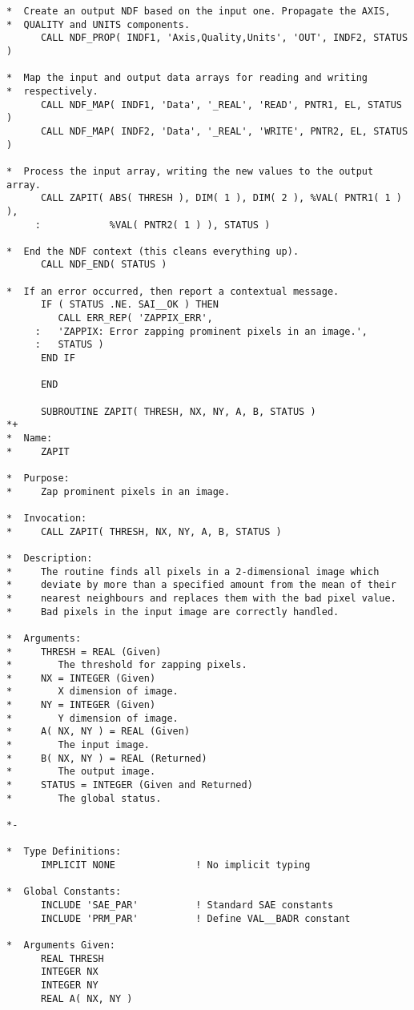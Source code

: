 \documentclass[twoside,11pt]{article}
\begin{document}
\begin{verbatim}
*  Create an output NDF based on the input one. Propagate the AXIS,
*  QUALITY and UNITS components.
      CALL NDF_PROP( INDF1, 'Axis,Quality,Units', 'OUT', INDF2, STATUS )

*  Map the input and output data arrays for reading and writing
*  respectively.
      CALL NDF_MAP( INDF1, 'Data', '_REAL', 'READ', PNTR1, EL, STATUS )
      CALL NDF_MAP( INDF2, 'Data', '_REAL', 'WRITE', PNTR2, EL, STATUS )
      
*  Process the input array, writing the new values to the output array.
      CALL ZAPIT( ABS( THRESH ), DIM( 1 ), DIM( 2 ), %VAL( PNTR1( 1 ) ),
     :            %VAL( PNTR2( 1 ) ), STATUS )

*  End the NDF context (this cleans everything up).
      CALL NDF_END( STATUS )

*  If an error occurred, then report a contextual message.
      IF ( STATUS .NE. SAI__OK ) THEN
         CALL ERR_REP( 'ZAPPIX_ERR',
     :   'ZAPPIX: Error zapping prominent pixels in an image.',
     :   STATUS )
      END IF

      END

      SUBROUTINE ZAPIT( THRESH, NX, NY, A, B, STATUS )
*+
*  Name:
*     ZAPIT

*  Purpose:
*     Zap prominent pixels in an image.

*  Invocation:
*     CALL ZAPIT( THRESH, NX, NY, A, B, STATUS )

*  Description:
*     The routine finds all pixels in a 2-dimensional image which
*     deviate by more than a specified amount from the mean of their
*     nearest neighbours and replaces them with the bad pixel value.
*     Bad pixels in the input image are correctly handled.

*  Arguments:
*     THRESH = REAL (Given)
*        The threshold for zapping pixels.
*     NX = INTEGER (Given)
*        X dimension of image.
*     NY = INTEGER (Given)
*        Y dimension of image.
*     A( NX, NY ) = REAL (Given)
*        The input image.
*     B( NX, NY ) = REAL (Returned)
*        The output image.
*     STATUS = INTEGER (Given and Returned)
*        The global status.

*-
      
*  Type Definitions:
      IMPLICIT NONE              ! No implicit typing

*  Global Constants:
      INCLUDE 'SAE_PAR'          ! Standard SAE constants
      INCLUDE 'PRM_PAR'          ! Define VAL__BADR constant

*  Arguments Given:
      REAL THRESH
      INTEGER NX
      INTEGER NY
      REAL A( NX, NY )


\end{verbatim}
\end{document}
